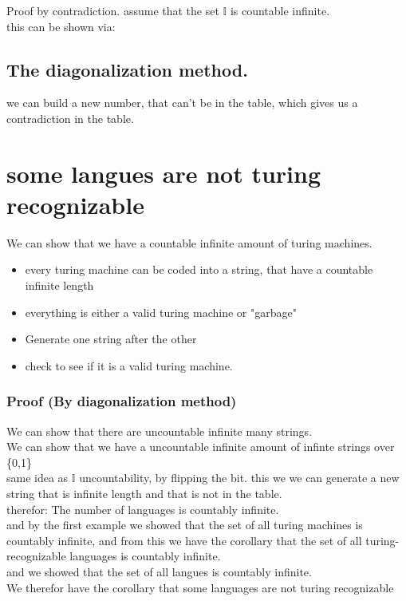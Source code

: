 \documentclass[a4paper,10pt,titlepage]{report}
\begin{document}
Proof by contradiction. assume that the set $\mathbb{I}$ is countable infinite.\\

this can be shown via:
\subsection{The diagonalization method.}
we can build a new number, that can't be in the table, which gives us a contradiction in the table.


\section*{some langues are not turing recognizable}
We can show that we have a countable infinite amount of turing machines.
\begin{itemize}
\item every turing machine can be coded into a string, that have a countable infinite length
\item everything is either a valid turing machine or "garbage"
\item Generate one string after the other
\item check to see if it is a valid turing machine.
\end{itemize}
\subsubsection{Proof (By diagonalization method)} 

We can show that there are uncountable infinite many strings.\\
We can show that we have a uncountable infinite amount of infinte strings over \{0,1\}\\

same idea as $\mathbb{I}$ uncountability, by flipping the bit. this we we can generate a new string that is infinite length and that is not in the table.\\

therefor: The number of languages is countably infinite.\\

and by the first example we showed that the set of all turing machines is countably infinite, and from this we have the corollary that the set of all turing-recognizable languages is countably infinite.\\
and we showed that the set of all langues is countably infinite.\\
We therefor have the corollary that some languages are not turing recognizable\\
\end{document}

